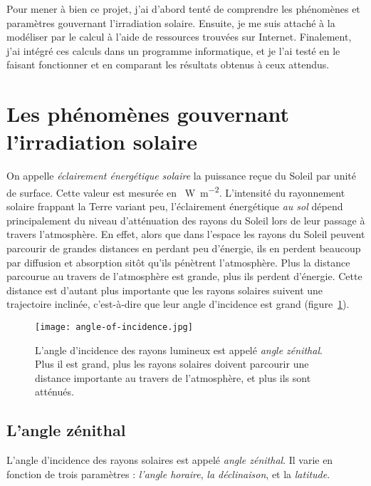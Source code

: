\documentclass[12pt]{article}
\begin{document}
\vspace{0.5cm}

Pour mener à bien ce projet, j'ai d'abord tenté de comprendre les phénomènes et paramètres gouvernant l'irradiation solaire.
Ensuite, je me suis attaché à la modéliser par le calcul à l'aide de ressources trouvées sur Internet.
Finalement, j'ai intégré ces calculs dans un programme informatique, et je l'ai testé en le faisant fonctionner et en comparant les résultats obtenus à ceux attendus.



\clearpage
\section{Les phénomènes gouvernant l'irradiation solaire}

On appelle \emph{éclairement énergétique solaire} la puissance reçue du Soleil par unité de surface.
Cette valeur est mesurée en \SI{}{\watt\per\square\meter}.
L'intensité du rayonnement solaire frappant la Terre variant peu, l'éclairement énergétique \emph{au sol} dépend principalement du niveau d'atténuation des rayons du Soleil lors de leur passage à travers l'atmosphère.
En effet, alors que dans l'espace les rayons du Soleil peuvent parcourir de grandes distances en perdant peu d'énergie, ils en perdent beaucoup par diffusion et absorption sitôt qu'ils pénètrent l'atmosphère.
Plus la distance parcourue au travers de l'atmosphère est grande, plus ils perdent d'énergie.
Cette distance est d'autant plus importante que les rayons solaires suivent une trajectoire inclinée, c'est-à-dire que leur angle d'incidence est grand (figure~\ref{fig:angle-of-incidence}).

 \begin{figure}[H]
	\centerline{\texttt{[image: angle-of-incidence.jpg]}}
	\caption{L'angle d'incidence des rayons lumineux est appelé \emph{angle zénithal}. Plus il est grand, plus les rayons solaires doivent parcourir une distance importante au travers de l'atmosphère, et plus ils sont atténués.}
	\label{fig:angle-of-incidence}
\end{figure}

\subsection{L'angle zénithal}
\label{sec:zenith-angle}
L'angle d'incidence des rayons solaires est appelé \emph{angle zénithal}.
Il varie en fonction de trois paramètres : \emph{l'angle horaire}, \emph{la déclinaison}, et la \emph{latitude}.
\end{document}
